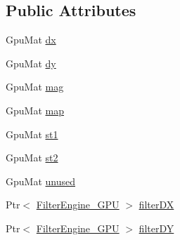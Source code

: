 \subsection*{Public Attributes}
\begin{DoxyCompactItemize}
\item 
Gpu\-Mat \hyperlink{structcv_1_1gpu_1_1CannyBuf_abe8804c3ac1ffe9d395002253c161edf}{dx}
\item 
Gpu\-Mat \hyperlink{structcv_1_1gpu_1_1CannyBuf_af6a87c2f0acf77054e2ba27f053aa587}{dy}
\item 
Gpu\-Mat \hyperlink{structcv_1_1gpu_1_1CannyBuf_ae64d28d2fdb6359ba57669baf810af19}{mag}
\item 
Gpu\-Mat \hyperlink{structcv_1_1gpu_1_1CannyBuf_ae0eff470f375924982d14c6609495ece}{map}
\item 
Gpu\-Mat \hyperlink{structcv_1_1gpu_1_1CannyBuf_ac14d75c111051f0a003036cb823b73aa}{st1}
\item 
Gpu\-Mat \hyperlink{structcv_1_1gpu_1_1CannyBuf_ab96fb51ce7d074263c5c9b503c38006e}{st2}
\item 
Gpu\-Mat \hyperlink{structcv_1_1gpu_1_1CannyBuf_a236ec0eda5749a86dc885b9c26c58d4e}{unused}
\item 
Ptr$<$ \hyperlink{classcv_1_1gpu_1_1FilterEngine__GPU}{Filter\-Engine\-\_\-\-G\-P\-U} $>$ \hyperlink{structcv_1_1gpu_1_1CannyBuf_a696a7f77590cda379ea4b275697f6d6c}{filter\-D\-X}
\item 
Ptr$<$ \hyperlink{classcv_1_1gpu_1_1FilterEngine__GPU}{Filter\-Engine\-\_\-\-G\-P\-U} $>$ \hyperlink{structcv_1_1gpu_1_1CannyBuf_abbf4d1c0a9096fad24ba817c58943aa6}{filter\-D\-Y}
\end{DoxyCompactItemize}


